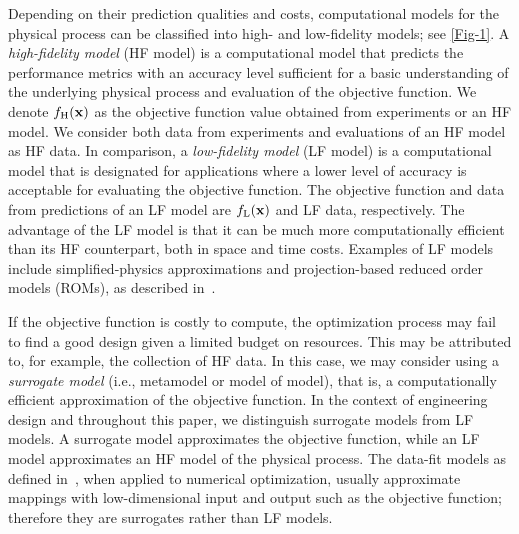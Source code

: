 \documentclass[journal ]{new-aiaa}
\begin{document}
	Depending on their prediction qualities and costs, computational models for the physical process can be classified into high- and low-fidelity models; see \cref{Fig-1}.
	A \textit{high-fidelity model} (HF model) is a computational model that predicts the performance metrics with an accuracy level sufficient for a basic understanding of the underlying physical process and evaluation of the objective function.
	We denote $f_\text{H}(\bf x)$ as the objective function value obtained from experiments or an HF model.
	We consider both data from experiments and evaluations of an HF model as HF data.
	In comparison, a \textit{low-fidelity model} (LF model) is a computational model that is designated for applications where a lower level of accuracy is acceptable for evaluating the objective function.
	The objective function and data from predictions of an LF model are $f_\text{L}(\bf x)$ and LF data, respectively.
	The advantage of the LF model is that it can be much more computationally efficient than its HF counterpart, both in space and time costs.
	Examples of LF models include simplified-physics approximations and projection-based reduced order models (ROMs), as described in~\citet{Peherstorfer2018}.
	
	If the objective function is costly to compute, the optimization process may fail to find a good design given a limited budget on resources.
	This may be attributed to, for example, the collection of HF data.
	In this case, we may consider using a \textit{surrogate model} (i.e., metamodel or model of model), that is, a computationally efficient approximation of the objective function.
	In the context of engineering design and throughout this paper, we distinguish surrogate models from LF models.
	A surrogate model approximates the objective function, while an LF model approximates an HF model of the physical process.
	The data-fit models as defined in~\citet{Peherstorfer2018}, when applied to numerical optimization, usually approximate mappings with low-dimensional input and output such as the objective function; therefore they are surrogates rather than LF models.
	
\end{document}
